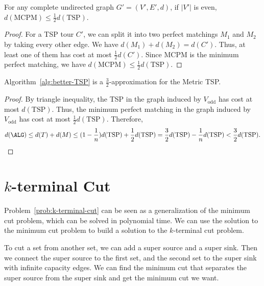 \begin{lemma}
	For any complete undirected graph $G' = (V',E',d)$, if $|V'|$ is even, $d(\text{MCPM})\le \frac{1}{2}d(\text{TSP})$.
\end{lemma}
\begin{proof}
	For a TSP tour $C'$, we can split it into two perfect matchings $M_1$ and $M_2$ by taking every other edge. We have $d(M_1) + d(M_2) = d(C')$. Thus, at least one of them has cost at most $\frac{1}{2}d(C')$. Since MCPM is the minimum perfect matching, we have $d(\text{MCPM}) \le \frac{1}{2}d(\text{TSP})$.
\end{proof}
\begin{theorem}
	Algorithm~\ref{alg:better-TSP} is a $\frac{3}{2}$-approximation for the Metric TSP.
\end{theorem}
\begin{proof}
	By triangle inequality, the TSP in the graph induced by $V_\text{odd}$ has cost at most $d(\text{TSP})$. Thus, the minimum perfect matching in the graph induced by $V_\text{odd}$ has cost at most $\frac{1}{2}d(\text{TSP})$.
	Therefore,
	\[ d(\ALG) \le d(T) + d(M) \le (1-\frac{1}{n})d(\text{TSP}) + \frac{1}{2}d(\text{TSP}) = \frac{3}{2}d(\text{TSP}) - \frac{1}{n}d(\text{TSP}) < \frac{3}{2}d(\text{TSP}).\]
\end{proof}

\section{$k$-terminal Cut}

Problem~\ref{prob:k-terminal-cut} can be seen as a generalization of the minimum cut problem, which can be solved in polynomial time. We can use the solution to the minimum cut problem to build a solution to the $k$-terminal cut problem.

\begin{remark}
	To cut a set from another set, we can add a super source and a super sink. Then we connect the super source to the first set, and the second set to the super sink with infinite capacity edges. We can find the minimum cut that separates the super source from the super sink and get the minimum cut we want.
\end{remark}

